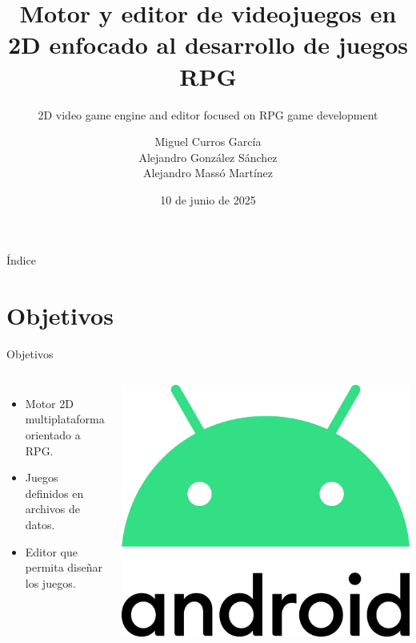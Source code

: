 \documentclass{beamer}
\title[Motor y editor de videojuegos en 2D enfocado al desarrollo de juegos RPG]{Motor y editor de videojuegos en 2D enfocado al desarrollo de juegos RPG}
\subtitle{2D video game engine and editor focused on RPG game development}
\author[Miguel Curros, Alejandro González y Alejandro Massó]{Miguel Curros García\\ Alejandro González Sánchez\\ Alejandro Massó Martínez}
\date{10 de junio de 2025}
\begin{document}
\frame{\titlepage}

\begin{frame}{Índice}
	\tableofcontents
\end{frame}

\section{Objetivos}
\begin{frame}{Objetivos}
	\begin{columns}
		\begin{itemize}
			\item Motor 2D multiplataforma orientado a RPG.
			\item Juegos definidos en archivos de datos.
			\item Editor que permita diseñar los juegos.
		\end{itemize}
		\includegraphics[width=\textwidth]{imgs/objetivos/android.pdf}
	\end{columns}
\end{frame}
\end{document}
